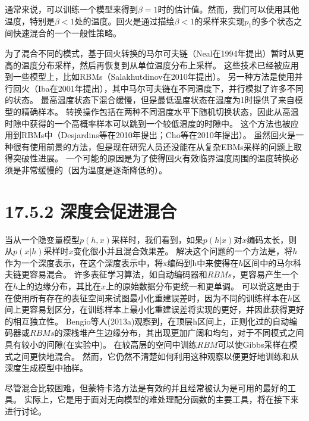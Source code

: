 通常来说，可以训练一个模型来得到$\beta=1$时的估计值。然而，我们可以使用其他温度，特别是$\beta<1$处的温度。回火是通过描绘$\beta<1$的采样来实现$p_{1}$的多个状态之间快速混合的一个一般性策略。

为了混合不同的模式，基于回火转换的马尔可夫链（Neal在1994年提出）暂时从更高的温度分布采样，然后再恢复到从单位温度分布上采样。
这些技术已经被应用到一些模型上，比如RBMs（Salakhutdinov在2010年提出）。
另一种方法是使用并行回火（Iba在2001年提出），其中马尔可夫链在不同温度下，并行模拟了许多不同的状态。
最高温度状态下混合缓慢，但是最低温度状态在温度为1时提供了来自模型的精确样本。
转换操作包括在两种不同温度水平下随机切换状态，因此从高温时隙中获得的一个高概率样本可以跳到一个较低温度的时隙中。
这个方法也被应用到RBMs中（Desjardins等在2010年提出；Cho等在2010年提出）。
虽然回火是一种很有使用前景的方法，但是现在研究人员还没能在从复杂EBMs采样的问题上取得突破性进展。
一个可能的原因是为了使得回火有效临界温度周围的温度转换必须是非常缓慢的（因为温度是逐渐降低的）。

\section{17.5.2 深度会促进混合}
\label{sec:17.5.2}

当从一个隐变量模型$p(h,x)$采样时，我们看到，如果$p(h|x)$对$x$编码太长，则从$p(x|h)$采样时$x$变化很小并且混合效果差。
解决这个问题的一个方法是，将$h$作为一个深度表示，在这个深度表示中，将x编码到h中来使得在$h$区间中的马尔科夫链更容易混合。
许多表征学习算法，如自动编码器和$RBMs$，更容易产生一个在$h$上的边缘分布，其比在$x$上的原始数据分布更统一和更单调。
可以说这是由于在使用所有存在的表征空间来试图最小化重建误差时，因为不同的训练样本在$h$区间上更容易划区分，在训练样本上最小化重建误差将实现的更好，并因此获得更好的相互独立性。
Bengio等人(2013a)观察到，在顶层h区间上，正则化过的自动编码器或$RBMs$的深栈堆产生边缘分布，其出现更加广阔和均匀，对于不同模式之间具有较小的间隙(在实验中)。
在较高层的空间中训练$RBM$可以使Gibbs采样在模式之间更快地混合。
然而，它仍然不清楚如何利用这种观察以便更好地训练和从深度生成模型中抽样。

尽管混合比较困难，但蒙特卡洛方法是有效的并且经常被认为是可用的最好的工具。
实际上，它是用于面对无向模型的难处理配分函数的主要工具，将在接下来进行讨论。
